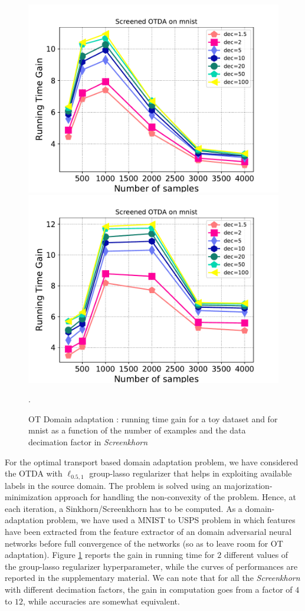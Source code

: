 \begin{figure}[t]
	\centering

	\includegraphics[width=6.cm]{./figs/da_gain_mnist_regcl1.pdf}
	\includegraphics[width=6.cm]{./figs/da_gain_mnist_regcl10.pdf}
	\caption{OT Domain adaptation : running time gain for a toy dataset and for mnist as a function of the number of examples and the data decimation factor in \emph{Screenkhorn}}.
	\label{fig:otda}
\end{figure}

For the optimal transport based domain adaptation problem, we have considered the
OTDA with $\ell_{0.5,1}$ group-lasso regularizer that helps in exploiting available labels in the source domain. The problem is solved using an majorization-minimization approach 
for handling the non-convexity of the problem. Hence, at each iteration, a Sinkhorn/Screenkhorn has to be computed. As a domain-adaptation problem, we have
used a MNIST to USPS problem in which features have been extracted from the
feature extractor of an domain adversarial neural networks \citep{ganin2016domain} before full convergence of the networks (so as to leave room for OT adaptation). 
Figure \ref{fig:otda} reports the gain in running time for $2$ different values
of the group-lasso regularizer hyperparameter, while the curves of performances are
reported in the supplementary material. We can note that for all the  \emph{Screenkhorn} with different decimation factors, the gain in computation goes from a factor of $4$ to $12$, while accuracies are somewhat equivalent.



